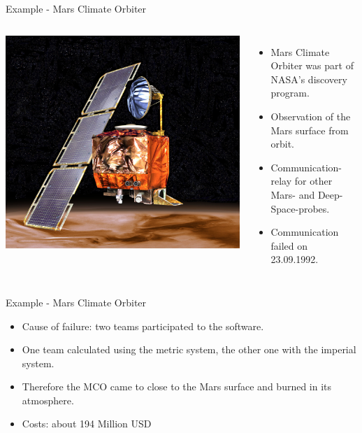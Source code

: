 \begin{frame}{Example - Mars Climate Orbiter}
\begin{columns}
\centering
\includegraphics[width=\textwidth]{content/images/software-quality/mco.jpg}
\begin{itemize}
	\item Mars Climate Orbiter was part of NASA's discovery program.
	\item Observation of the Mars surface from orbit.
	\item Communication-relay for other Mars- and Deep-Space-probes.
	\item Communication failed on 23.09.1992.
\end{itemize}
\end{columns} 
\end{frame}


\begin{frame}{Example - Mars Climate Orbiter}
\begin{itemize}
	\item Cause of failure: two teams participated to the software.
	\item One team calculated using the metric system, the other one with the imperial system.
	\item Therefore the MCO came to close to the Mars surface and burned in its atmosphere.
	\item Costs: about 194 Million USD
\end{itemize}
\end{frame}


